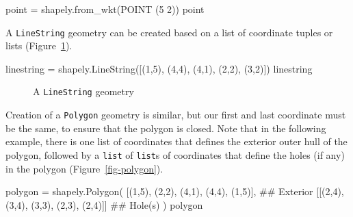 \documentclass[
  letterpaper,
]{krantz}
\newenvironment{Shaded}{\begin{snugshade}}{\end{snugshade}}
\newcommand{\CommentTok}[1]{\textcolor[rgb]{0.37,0.37,0.37}{#1}}
\newcommand{\DecValTok}[1]{\textcolor[rgb]{0.68,0.00,0.00}{#1}}
\newcommand{\NormalTok}[1]{\textcolor[rgb]{0.00,0.23,0.31}{#1}}
\newcommand{\OperatorTok}[1]{\textcolor[rgb]{0.37,0.37,0.37}{#1}}
\newcommand{\StringTok}[1]{\textcolor[rgb]{0.13,0.47,0.30}{#1}}
\begin{document}
\begin{Shaded}
\begin{Highlighting}[]
\NormalTok{point }\OperatorTok{=}\NormalTok{ shapely.from\_wkt(}\StringTok{\textquotesingle{}POINT (5 2)\textquotesingle{}}\NormalTok{)}
\NormalTok{point}
\end{Highlighting}
\end{Shaded}

A \texttt{\textquotesingle{}LineString\textquotesingle{}} geometry can
be created based on a list of coordinate tuples or lists
(Figure~\ref{fig-linestring}).

\begin{Shaded}
\begin{Highlighting}[]
\NormalTok{linestring }\OperatorTok{=}\NormalTok{ shapely.LineString([(}\DecValTok{1}\NormalTok{,}\DecValTok{5}\NormalTok{), (}\DecValTok{4}\NormalTok{,}\DecValTok{4}\NormalTok{), (}\DecValTok{4}\NormalTok{,}\DecValTok{1}\NormalTok{), (}\DecValTok{2}\NormalTok{,}\DecValTok{2}\NormalTok{), (}\DecValTok{3}\NormalTok{,}\DecValTok{2}\NormalTok{)])}
\NormalTok{linestring}
\end{Highlighting}
\end{Shaded}

\begin{figure}[H]


\caption{\label{fig-linestring}A \texttt{LineString} geometry}

\end{figure}%

Creation of a \texttt{\textquotesingle{}Polygon\textquotesingle{}}
geometry is similar, but our first and last coordinate must be the same,
to ensure that the polygon is closed. Note that in the following
example, there is one list of coordinates that defines the exterior
outer hull of the polygon, followed by a \texttt{list} of \texttt{list}s
of coordinates that define the holes (if any) in the polygon
(Figure~\ref{fig-polygon}).

\begin{Shaded}
\begin{Highlighting}[]
\NormalTok{polygon }\OperatorTok{=}\NormalTok{ shapely.Polygon(}
\NormalTok{    [(}\DecValTok{1}\NormalTok{,}\DecValTok{5}\NormalTok{), (}\DecValTok{2}\NormalTok{,}\DecValTok{2}\NormalTok{), (}\DecValTok{4}\NormalTok{,}\DecValTok{1}\NormalTok{), (}\DecValTok{4}\NormalTok{,}\DecValTok{4}\NormalTok{), (}\DecValTok{1}\NormalTok{,}\DecValTok{5}\NormalTok{)],  }\CommentTok{\#\# Exterior}
\NormalTok{    [[(}\DecValTok{2}\NormalTok{,}\DecValTok{4}\NormalTok{), (}\DecValTok{3}\NormalTok{,}\DecValTok{4}\NormalTok{), (}\DecValTok{3}\NormalTok{,}\DecValTok{3}\NormalTok{), (}\DecValTok{2}\NormalTok{,}\DecValTok{3}\NormalTok{), (}\DecValTok{2}\NormalTok{,}\DecValTok{4}\NormalTok{)]]  }\CommentTok{\#\# Hole(s)}
\NormalTok{)}
\NormalTok{polygon}
\end{Highlighting}
\end{Shaded}
\end{document}
